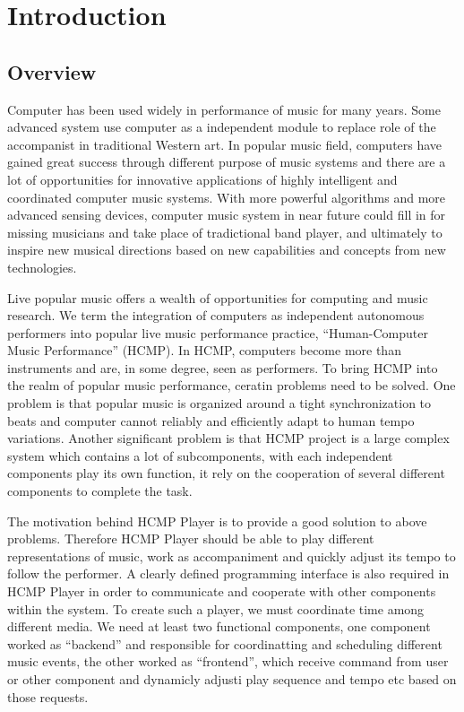 \chapter{Introduction}

\ifpdf
    \graphicspath{{1_introduction/figures/PNG/}{1_introduction/figures/PDF/}{1_introduction/figures/}}
\else
    \graphicspath{{1_introduction/figures/EPS/}{1_introduction/figures/}}
\fi

\section{Overview}
Computer has been used widely in performance of music for many years. 
Some advanced system use computer as a independent module to replace 
role of the accompanist in traditional Western art. 
In popular music field, computers have gained great success through different 
purpose of music systems and there are
a lot of opportunities for innovative applications of highly
intelligent and coordinated computer music systems. With more powerful algorithms
and more advanced sensing devices, 
computer music system in near future could fill in for missing
musicians and take place of tradictional band player, and ultimately 
to inspire new musical directions based on
new capabilities and concepts from new technologies.

Live popular music offers a wealth of opportunities for computing and music 
research. We term the integration of computers as independent 
autonomous performers into popular live music performance practice, 
``Human-Computer Music Performance'' (HCMP). In HCMP, computers become more 
than instruments and are, in some degree, seen as performers. To 
bring HCMP into the realm of popular music performance, ceratin problems
need to be solved. One problem is that popular music is organized around  
a tight synchronization to beats and computer cannot reliably and efficiently 
adapt to human tempo variations. Another significant problem is that
HCMP project is a large complex system which contains a lot of subcomponents, 
with each independent components play its own function, it rely on the 
cooperation of several different components to complete the task.

The motivation behind HCMP Player is to provide a good solution to above problems.
Therefore HCMP Player should be able to play different representations of music, 
work as accompaniment and quickly 
adjust its tempo to follow the performer. A clearly defined programming interface 
is also required in HCMP Player in order to communicate and cooperate 
with other components within
the system. To create such a player, 
we must coordinate time among different media. We need at least two
functional components, one component worked as ``backend'' and 
responsible for coordinatting and scheduling different music events, 
the other worked as ``frontend'', which receive command from user or other component 
and dynamicly adjusti play sequence and tempo etc based on those requests.

